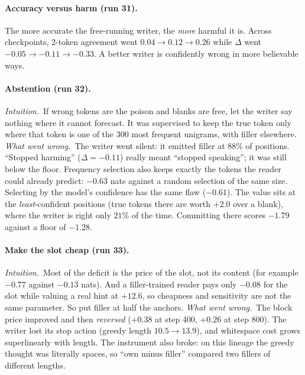 \documentclass[11pt]{article}
\newcommand{\why}{\emph{Intuition.}\ }
\newcommand{\fail}{\emph{What went wrong.}\ }
\begin{document}
\paragraph{Accuracy versus harm (run 31).}
The more accurate the free-running writer, the \emph{more} harmful it is. Across checkpoints, 2-token agreement went $0.04\to0.12\to0.26$ while $\Delta$ went $-0.05\to-0.11\to-0.33$. A better writer is confidently wrong in more believable ways.

\paragraph{Abstention (run 32).}
\why If wrong tokens are the poison and blanks are free, let the writer say nothing where it cannot forecast. It was supervised to keep the true token only where that token is one of the 300 most frequent unigrams, with filler elsewhere.
\fail The writer went silent: it emitted filler at $88\%$ of positions. ``Stopped harming'' ($\Delta=-0.11$) really meant ``stopped speaking''; it was still below the floor. Frequency selection also keeps exactly the tokens the reader could already predict: $-0.63$ nats against a random selection of the same size. Selecting by the model's confidence has the same flaw ($-0.61$). The value sits at the \emph{least}-confident positions (true tokens there are worth $+2.0$ over a blank), where the writer is right only $21\%$ of the time. Committing there scores $-1.79$ against a floor of $-1.28$.

\paragraph{Make the slot cheap (run 33).}
\why Most of the deficit is the price of the slot, not its content (for example $-0.77$ against $-0.13$ nats). And a filler-trained reader pays only $-0.08$ for the slot while valuing a real hint at $+12.6$, so cheapness and sensitivity are not the same parameter. So put filler at half the anchors.
\fail The block price improved and then \emph{reversed} ($+0.38$ at step 400, $+0.26$ at step 800). The writer lost its stop action (greedy length $10.5\to13.9$), and whitespace cost grows superlinearly with length. The instrument also broke: on this lineage the greedy thought was literally spaces, so ``own minus filler'' compared two fillers of different lengths.
\end{document}
